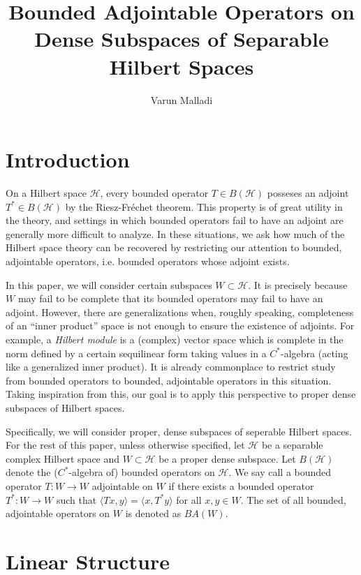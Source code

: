 \documentclass[12pt]{article}
\title{Bounded Adjointable Operators on Dense Subspaces of Separable Hilbert Spaces}
\author{Varun Malladi}
\begin{document}
\maketitle

\tableofcontents

\section{Introduction} %

On a Hilbert space $\mathcal{H}$, every bounded operator $T\in B(\mathcal{H})$ posseses an adjoint $T^\ast\in B(\mathcal{H})$ by the Riesz-Fr\'echet theorem. This property is of great utility in the theory, and settings in which bounded operators fail to have an adjoint are generally more difficult to analyze. In these situations, we ask how much of the Hilbert space theory can be recovered by restricting our attention to bounded, adjointable operators, i.e. bounded operators whose adjoint exists. 

In this paper, we will consider certain subspaces $W\subset\mathcal{H}$. It is precisely because $W$ may fail to be complete that its bounded operators may fail to have an adjoint. However, there are generalizations when, roughly speaking, completeness of an ``inner product'' space is not enough to ensure the existence of adjoints. For example, a \textit{Hilbert module} is a (complex) vector space which is complete in the norm defined by a certain sequilinear form taking values in a $C^\ast$-algebra (acting like a generalized inner product). It is already commonplace to restrict study from bounded operators to bounded, adjointable operators in this situation. Taking inspiration from this, our goal is to apply this perspective to proper dense subspaces of Hilbert spaces.

Specifically, we will consider proper, dense subspaces of seperable Hilbert spaces. For the rest of this paper, unless otherwise specified, let $\mathcal{H}$ be a separable complex Hilbert space and $W\subset\mathcal{H}$ be a proper dense subspace. Let $B(\mathcal{H})$ denote the ($C^\ast$-algebra of) bounded operators on $\mathcal{H}$. We say call a bounded operator $T:W\to W$ adjointable on $W$ if there exists a bounded operator $T^\ast: W\to W$ such that $\langle Tx, y\rangle = \langle x, T^\ast y\rangle$ for all $x,y\in W$. The set of all bounded, adjointable operators on $W$ is denoted as $BA(W)$.  


\section{Linear Structure} %
\end{document}
